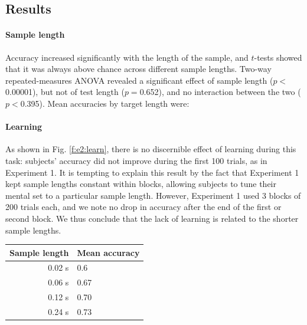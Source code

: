 \subsection{Results}

\paragraph{Sample length}

Accuracy increased significantly with the length of the sample, and $t$-tests showed that it was always above chance across different sample lengths. Two-way repeated-measures ANOVA revealed a significant effect of sample length ($p<$0.00001), but not of test length ($p=$0.652), and no interaction between the two ($p<$0.395). Mean accuracies by target length were:


\paragraph{Learning}

As shown in Fig. \ref{f:e2:learn}, there is no discernible effect of learning during this task: subjects' accuracy did not improve during the first 100 trials, as in Experiment 1. It is tempting to explain this result by the fact that Experiment 1 kept sample lengths constant within blocks, allowing subjects to tune their mental set to a particular sample length. However, Experiment 1 used 3 blocks of 200 trials each, and we note no drop in accuracy after the end of the first or second block. We thus conclude that the lack of learning is related to the shorter sample lengths.

\begin{center}
\begin{tabular}{ r | l   }
\textbf{Sample length} & \textbf{Mean accuracy}\\
\hline
0.02 s &  0.6\\
0.06 s&  0.67\\
0.12 s& 0.70\\
0.24 s&  0.73\\
\end{tabular}
\end{center}

